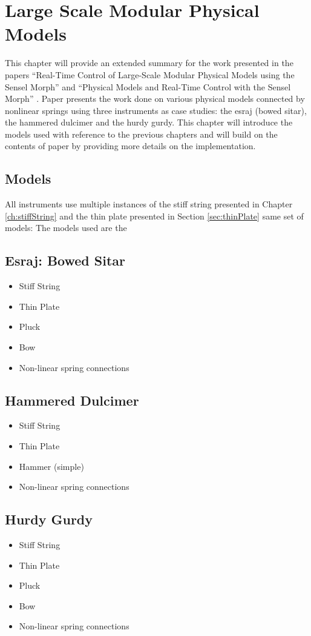 \chapter{Large Scale Modular Physical Models}\label{ch:largeScale}
This chapter will provide an extended summary for the work presented in the papers ``Real-Time Control of Large-Scale Modular Physical Models using the Sensel Morph'' \citeP[A] and ``Physical Models and Real-Time Control with the Sensel Morph'' \citeP[B]. Paper \citeP[A] presents the work done on various physical models connected by nonlinear springs using three instruments as case studies: the esraj (bowed sitar), the hammered dulcimer and the hurdy gurdy. This chapter will introduce the models used with reference to the previous chapters and will build on the contents of paper \citeP[A] by providing more details on the implementation.

\section{Models}
All instruments use multiple instances of the stiff string presented in Chapter \ref{ch:stiffString} and the thin plate presented in Section \ref{sec:thinPlate} same set of models: The models used are the 

\section{Esraj: Bowed Sitar}
\begin{itemize}
    \item Stiff String
    \item Thin Plate
    \item Pluck
    \item Bow
    \item Non-linear spring connections
\end{itemize}

\section{Hammered Dulcimer}
\begin{itemize}
    \item Stiff String
    \item Thin Plate
    \item Hammer (simple)
    \item Non-linear spring connections
\end{itemize}

\section{Hurdy Gurdy}
\begin{itemize}
    \item Stiff String
    \item Thin Plate
    \item Pluck
    \item Bow
    \item Non-linear spring connections
\end{itemize}



